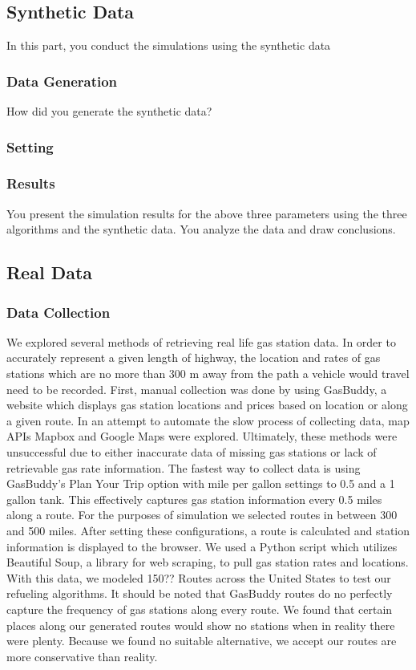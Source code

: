 \documentclass[conference]{IEEEtran}
\theoremstyle{definition}
\begin{document}
\subsection{Synthetic Data}
{\color{red} In this part, you conduct the simulations using the synthetic data

\subsubsection{Data Generation}
How did you generate the synthetic data?

\subsubsection{Setting}

\subsubsection{Results}
You present the simulation results for the above three parameters using the three algorithms and the synthetic data. You analyze the data and draw conclusions. }


\subsection{Real Data}

\subsubsection{Data Collection}
We explored several methods of retrieving real life gas station data. In order to accurately represent a given length of highway, the location and rates of gas stations which are no more than 300 m away from the path a vehicle would travel need to be recorded. First, manual collection was done by using GasBuddy, a website which displays gas station locations and prices based on location or along a given route. In an attempt to automate the slow process of collecting data, map APIs Mapbox and Google Maps were explored. Ultimately, these methods were unsuccessful due to either inaccurate data of missing gas stations or lack of retrievable gas rate information. The fastest way to collect data is using GasBuddy’s Plan Your Trip option with mile per gallon settings to 0.5 and a 1 gallon tank. This effectively captures gas station information every 0.5 miles along a route. For the purposes of simulation we selected routes in between 300 and 500 miles. After setting these configurations, a route is calculated and station information is displayed to the browser. We used a Python script which utilizes Beautiful Soup, a library for web scraping, to pull gas station rates and locations. With this data, we modeled 150?? Routes across the United States to test our refueling algorithms. It should be noted that GasBuddy routes do no perfectly capture the frequency of gas stations along every route. We found that certain places along our generated routes would show no stations when in reality there were plenty. Because we found no suitable alternative, we accept our routes are more conservative than reality.
\end{document}
